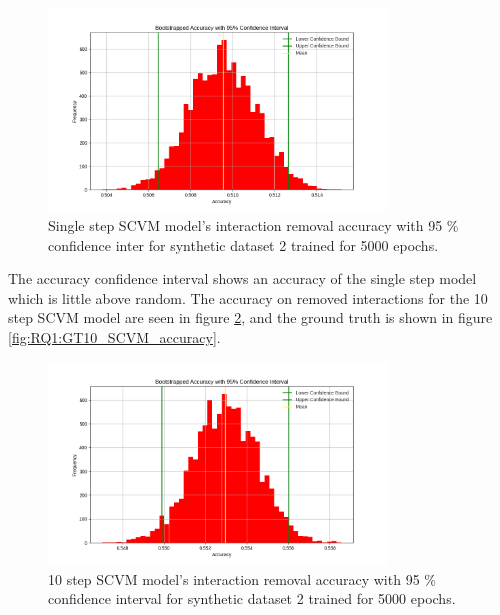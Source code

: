 \begin{figure}[H]
    \centering
    \centering
    \includegraphics[width=0.8\textwidth]{0_images/rq1_2_1step_accuracy_plot.png}
    \caption{Single step SCVM model's interaction removal accuracy with 95 \% confidence inter for synthetic dataset 2 trained for 5000 epochs.}
    \label{fig:RQ1:1step_SCVM_accuracy}
\end{figure}
\noindent
The accuracy confidence interval shows an accuracy of the single step model which is little above random. 
\clearpage
\vspace*{-2cm}
\noindent
The accuracy on removed interactions for the 10 step SCVM model are seen in figure \ref{fig:RQ1:10step_SCVM_accuracy}, and the ground truth is shown in figure \ref{fig:RQ1:GT10_SCVM_accuracy}.
\begin{figure}[H]
    \centering
    \includegraphics[width=0.8\textwidth]{0_images/10step_SCVM_Accuracy_Plot.png}
    \caption{10 step SCVM model's interaction removal accuracy with 95 \% confidence interval for synthetic dataset 2 trained for 5000 epochs.}
    \label{fig:RQ1:10step_SCVM_accuracy}
\end{figure}
